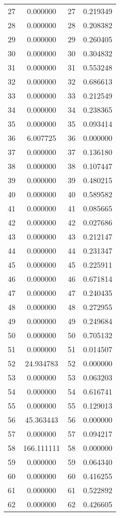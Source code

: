 \documentclass[12pt]{article}
\begin{document}
\begin{longtable}{@{}cccc@{}}
27 & 0.000000 & 27 & 0.219349 \\
28 & 0.000000 & 28 & 0.208382 \\
29 & 0.000000 & 29 & 0.260405 \\
30 & 0.000000 & 30 & 0.304832 \\
31 & 0.000000 & 31 & 0.553248 \\
32 & 0.000000 & 32 & 0.686613 \\
33 & 0.000000 & 33 & 0.212549 \\
34 & 0.000000 & 34 & 0.238365 \\
35 & 0.000000 & 35 & 0.093414 \\
36 & 6.007725 & 36 & 0.000000 \\
37 & 0.000000 & 37 & 0.136180 \\
38 & 0.000000 & 38 & 0.107447 \\
39 & 0.000000 & 39 & 0.480215 \\
40 & 0.000000 & 40 & 0.589582 \\
41 & 0.000000 & 41 & 0.085665 \\
42 & 0.000000 & 42 & 0.027686 \\
43 & 0.000000 & 43 & 0.212147 \\
44 & 0.000000 & 44 & 0.231347 \\
45 & 0.000000 & 45 & 0.225911 \\
46 & 0.000000 & 46 & 0.671814 \\
47 & 0.000000 & 47 & 0.240435 \\
48 & 0.000000 & 48 & 0.272955 \\
49 & 0.000000 & 49 & 0.249684 \\
50 & 0.000000 & 50 & 0.705132 \\
51 & 0.000000 & 51 & 0.014507 \\
52 & 24.934783 & 52 & 0.000000 \\
53 & 0.000000 & 53 & 0.063203 \\
54 & 0.000000 & 54 & 0.616741 \\
55 & 0.000000 & 55 & 0.129013 \\
56 & 45.363443 & 56 & 0.000000 \\
57 & 0.000000 & 57 & 0.094217 \\
58 & 166.111111 & 58 & 0.000000 \\
59 & 0.000000 & 59 & 0.064340 \\
60 & 0.000000 & 60 & 0.416255 \\
61 & 0.000000 & 61 & 0.522892 \\
62 & 0.000000 & 62 & 0.426605 \\

\end{longtable}
\end{document}
